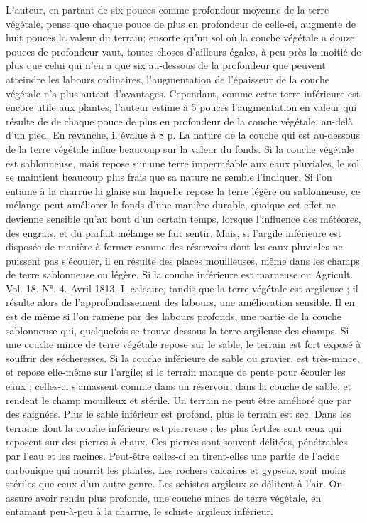 L'auteur, en partant de six pouces comme profondeur moyenne de la terre végétale, pense que chaque pouce de plus en profondeur de celle-ci, augmente de huit pouces la valeur du terrain; ensorte qu'un sol où la couche végétale a douze pouces de profondeur vaut, toutes choses d'ailleurs égales, à-peu-près la moitié de plus que celui qui n'en a que six au-dessous de la profondeur que peuvent atteindre les labours ordinaires, l'augmentation de l'épaisseur de la couche végétale n'a plus autant d'avantages. Cependant, comme cette terre inférieure est encore utile aux plantes, l'auteur estime à 5 pouces l'augmentation en valeur qui résulte de\setcounter{page}{133} de chaque pouce de plus en profondeur de la couche végétale, au-delà d'un pied.
En revanche, il évalue à 8 p. %
La nature de la couche qui est au-dessous de la terre végétale influe beaucoup sur la valeur du fonds. Si la couche végétale est sablonneuse, mais repose sur une terre imperméable aux eaux pluviales, le sol se maintient beaucoup plus frais que sa nature ne semble l'indiquer. Si l'on entame à la charrue la glaise sur laquelle repose la terre légère ou sablonneuse, ce mélange peut améliorer le fonds d'une manière durable, quoique cet effet ne devienne sensible qu'au bout d'un certain temps, lorsque l'influence des météores, des engrais, et du parfait mélange se fait sentir.
Mais, si l'argile inférieure est disposée de manière à former comme des réservoirs dont les eaux pluviales ne puissent pas s'écouler, il en résulte des places mouilleuses, même dans les champs de terre sablonneuse ou légère.
Si la couche inférieure est marneuse ou
Agricult. Vol. 18. N°. 4. Avril 1813. L\setcounter{page}{134} calcaire, tandis que la terre végétale est argileuse ; il résulte alors de l'approfondissement des labours, une amélioration sensible. Il en est de même si l'on ramène par des labours profonds, une partie de la couche sablonneuse qui, quelquefois se trouve dessous la terre argileuse des champs. Si une couche mince de terre végétale repose sur le sable, le terrain est fort exposé à souffrir des sécheresses. Si la couche inférieure de sable ou gravier, est très-mince, et repose elle-même sur l'argile; si le terrain manque de pente pour écouler les eaux ; celles-ci s'amassent comme dans un réservoir, dans la couche de sable, et rendent le champ mouilleux et stérile. Un terrain ne peut être amélioré que par des saignées. Plus le sable inférieur est profond, plus le terrain est sec. Dans les terrains dont la couche inférieure est pierreuse ; les plus fertiles sont ceux qui reposent sur des pierres à chaux. Ces pierres sont souvent délitées, pénétrables par l'eau et les racines. Peut-être celles-ci en tirent-elles une partie de l'acide carbonique qui nourrit les plantes. Les rochers calcaires et gypseux sont moins stériles que ceux d'un autre genre.\setcounter{page}{135} Les schistes argileux se délitent à l'air. On assure avoir rendu plus profonde, une couche mince de terre végétale, en entamant peu-à-peu à la charrue, le schiste argileux inférieur.
